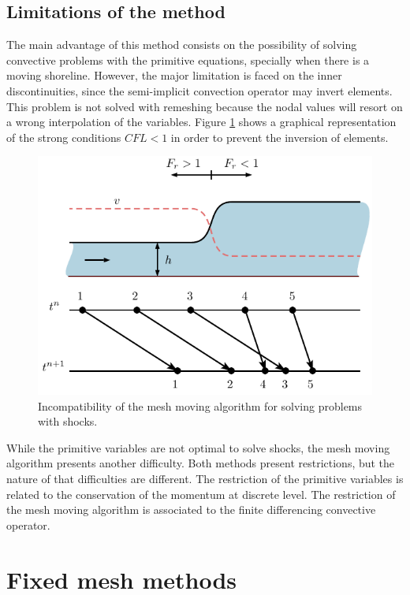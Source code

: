 \subsection{Limitations of the method}

The main advantage of this method consists on the possibility of solving convective problems with the primitive equations, specially when there is a moving shoreline. However, the major limitation is faced on the inner discontinuities, since the semi-implicit convection operator may invert elements. This problem is not solved with remeshing because the nodal values will resort on a wrong interpolation of the variables. Figure \ref{pfem_shock} shows a graphical representation of the strong conditions $CFL<1$ in order to prevent the inversion of elements.

\begin{figure} [htb]
    \centering
    \includegraphics[width=.8\textwidth]{img/lagrangian/pfem_shock.pdf}
    \caption{Incompatibility of the mesh moving algorithm for solving problems with shocks.}
    \label{pfem_shock}
\end{figure}

While the primitive variables are not optimal to solve shocks, the mesh moving algorithm presents another difficulty.
Both methods present restrictions, but the nature of that difficulties are different. The restriction of the primitive variables is related to the conservation of the momentum at discrete level. The restriction of the mesh moving algorithm is associated to the finite differencing convective operator.





\section{Fixed mesh methods}


